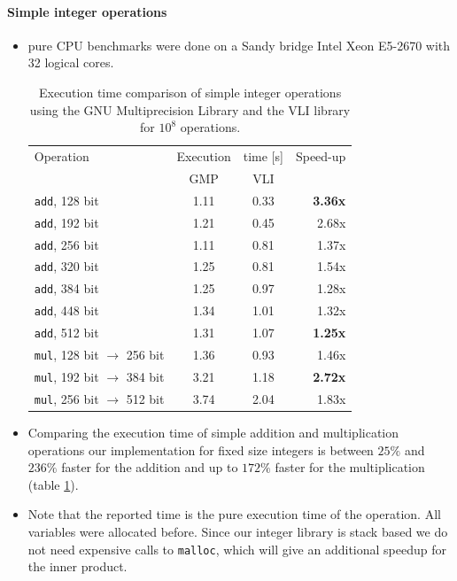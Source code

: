 \documentclass[oribibl]{llncs2e/llncs}
\begin{document}
\paragraph{Simple integer operations}
\begin{itemize}
\item pure CPU benchmarks were done on a Sandy bridge Intel Xeon E5-2670 with 32 logical cores.
\begin{table}
    \begin{center}
    \begin{tabular}{l|cc|r}
     Operation & Execution & time [s] & Speed-up\\
       & GMP & VLI & \\
     \hline
    \verb|add|, 128 bit & 1.11 & 0.33 & {\bf 3.36x} \\
    \verb|add|, 192 bit & 1.21 & 0.45 & 2.68x \\
    \verb|add|, 256 bit & 1.11 & 0.81 & 1.37x \\
    \verb|add|, 320 bit & 1.25 & 0.81 & 1.54x \\
    \verb|add|, 384 bit & 1.25 & 0.97 & 1.28x \\
    \verb|add|, 448 bit & 1.34 & 1.01 & 1.32x \\
    \verb|add|, 512 bit & 1.31 & 1.07 & {\bf 1.25x} \\
    \hline
    \verb|mul|, 128 bit $\rightarrow$ 256 bit & 1.36 & 0.93 & 1.46x \\
    \verb|mul|, 192 bit $\rightarrow$ 384 bit & 3.21 & 1.18 & {\bf 2.72x} \\
    \verb|mul|, 256 bit $\rightarrow$ 512 bit & 3.74 & 2.04 & 1.83x \\ 
    \end{tabular}
    \caption{Execution time comparison of simple integer operations using the GNU Multiprecision Library and the VLI library for $10^8$ operations.}
    \label{tab:vli_vs_gmp}
    \end{center}
\end{table}
\item Comparing the execution time of simple addition and multiplication operations our implementation for fixed size integers is between $25\%$ and $236\%$ faster for the addition and up to $172\%$ faster for the multiplication (table \ref{tab:vli_vs_gmp}).
\item Note that the reported time is the pure execution time of the operation. All variables were allocated before.
Since our integer library is stack based we do not need expensive calls to \verb|malloc|, which will give an additional speedup for the inner product.
\end{itemize}
\end{document}
